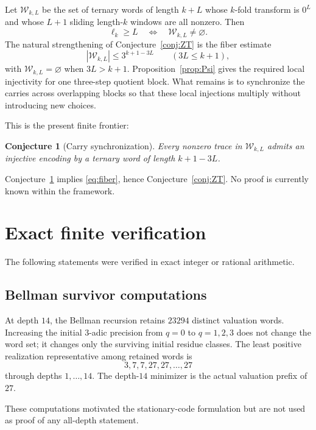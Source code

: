 \documentclass[11pt,reqno]{amsart}
\numberwithin{equation}{section}
\newtheorem{conjecture}[theorem]{Conjecture}
\theoremstyle{definition}
\theoremstyle{remark}
\newcommand{\cW}{\mathscr W}
\begin{document}
Let $\cW_{k,L}$ be the set of ternary words of length $k+L$ whose $k$-fold transform is $0^L$ and whose $L+1$ sliding length-$k$ windows are all nonzero.  Then
\[
 \ell_k\ge L
 \quad\Longleftrightarrow\quad
 \cW_{k,L}\ne\varnothing.
\]
The natural strengthening of Conjecture~\ref{conj:ZT} is the fiber estimate
\begin{equation}\label{eq:fiber}
 |\cW_{k,L}|
 \le3^{k+1-3L}
 \qquad(3L\le k+1),
\end{equation}
with $\cW_{k,L}=\varnothing$ when $3L>k+1$.  Proposition~\ref{prop:Psi} gives the required local injectivity for one three-step quotient block.  What remains is to synchronize the carries across overlapping blocks so that these local injections multiply without introducing new choices.

This is the present finite frontier:

\begin{conjecture}[Carry synchronization]\label{conj:carry}
Every nonzero trace in $\cW_{k,L}$ admits an injective encoding by a ternary word of length $k+1-3L$.
\end{conjecture}

Conjecture~\ref{conj:carry} implies \eqref{eq:fiber}, hence Conjecture~\ref{conj:ZT}.  No proof is currently known within the framework.

\section{Exact finite verification}\label{sec:computations}

The following statements were verified in exact integer or rational arithmetic.

\subsection{Bellman survivor computations}

At depth $14$, the Bellman recursion retains $23294$ distinct valuation words.  Increasing the initial $3$-adic precision from $q=0$ to $q=1,2,3$ does not change the word set; it changes only the surviving initial residue classes.  The least positive realization representative among retained words is
\[
 3,7,7,27,27,\ldots,27
\]
through depths $1,\ldots,14$.  The depth-$14$ minimizer is the actual valuation prefix of $27$.

These computations motivated the stationary-code formulation but are not used as proof of any all-depth statement.
\end{document}
